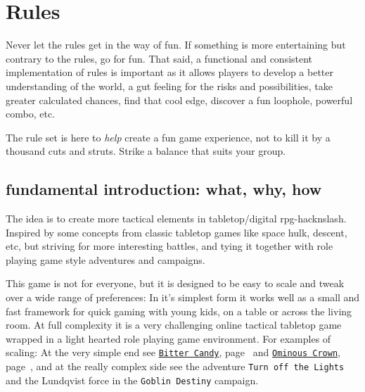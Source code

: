 

%
%


\cleardoublepage



\chapter*{Rules}
Never let the rules get in the way of fun. If something is more entertaining but contrary to the rules, go for fun. That said, a functional and consistent implementation of rules is important as it allows players to develop a better understanding of the world, a gut feeling for the risks and possibilities, take greater calculated chances, find that cool edge, discover a fun loophole, powerful combo, etc.

The rule set is here to \emph{help} create a fun game experience, not to kill it by a thousand cuts and struts. Strike a balance that suits your group. 


\section*{fundamental introduction: what, why, how}
The idea is to create more tactical elements in tabletop/digital rpg-hacknslash. Inspired by some concepts from classic tabletop games like space hulk, descent, etc, but striving for more interesting battles, and tying it together with role playing game style adventures and campaigns.

This game is not for everyone, but it is designed to be easy to scale and tweak over a wide range of preferences: In it's simplest form it works well as a small and fast framework for quick gaming with young kids, on a table or across the living room. At full complexity it is a very challenging online tactical tabletop game wrapped in a light hearted role playing game environment.
For examples of scaling: At the very simple end see 
\hyperref[sec:youngkids]{\texttt{Bitter Candy}}, page~\pageref{sec:youngkids} and 
\hyperref[sec:basicenough]{\texttt{Ominous Crown}}, page~\pageref{sec:basicenough}, 
and at the really complex side see the adventure 
\texttt{Turn off the Lights} and 
the Lundqvist force in the \texttt{Goblin Destiny} 
campaign.

